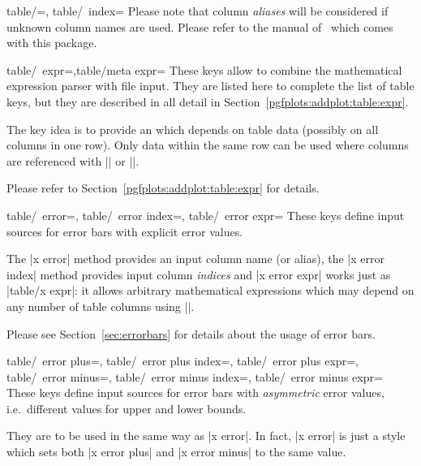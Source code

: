 {\begin{pgfplotsxykeylist}{table/\x=,
	table/\x\ index=}
	Please note that column \emph{aliases} will be considered if unknown column names are used. Please refer to the manual of \PGFPlotstable\ which comes with this package.
\end{pgfplotsxykeylist}

\begin{pgfplotsxykeylist}{table/\x\ expr=,table/meta expr=}
	These keys allow to combine the mathematical expression parser with file input. They are listed here to complete the list of table keys, but they are described in all detail in Section~\ref{pgfplots:addplot:table:expr}.

	The key idea is to provide an  which depends on table data (possibly on all columns in one row). Only data within the same row can be used where columns are referenced with |\thisrow| or |\thisrowno|. 
	
	Please refer to Section~\ref{pgfplots:addplot:table:expr} for details.
\end{pgfplotsxykeylist}


\begin{pgfplotsxykeylist}{%
	table/\x\ error=,
	table/\x\ error index=,
	table/\x\ error expr=}
	These keys define input sources for error bars with explicit error values. 
	
	The |x error| method provides an input column name (or alias), the |x error index| method provides input column \emph{indices} and |x error expr| works just as |table/x expr|: it allows arbitrary mathematical expressions which may depend on any number of table columns using |\thisrow|.

	Please see Section~\ref{sec:errorbars} for details about the usage of error bars.
\end{pgfplotsxykeylist}

\begin{pgfplotsxykeylist}{%
	table/\x\ error plus=,
	table/\x\ error plus index=,
	table/\x\ error plus expr=,
	table/\x\ error minus=,
	table/\x\ error minus index=,
	table/\x\ error minus expr=%
}
	These keys define input sources for error bars with \emph{asymmetric} error values, i.e.\ different values for upper and lower bounds. 
	
	They are to be used in the same way as |x error|. In fact, |x error| is just a style which sets both |x error plus| and |x error minus| to the same value.


\end{pgfplotsxykeylist}}
